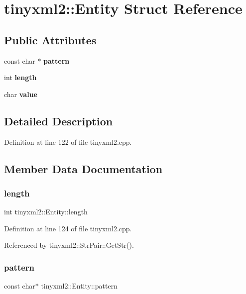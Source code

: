 \section{tinyxml2\+::Entity Struct Reference}
\label{structtinyxml2_1_1_entity}
\subsection*{Public Attributes}
\begin{DoxyCompactItemize}
\item 
const char $\ast$ \textbf{ pattern}
\item 
int \textbf{ length}
\item 
char \textbf{ value}
\end{DoxyCompactItemize}


\subsection{Detailed Description}


Definition at line 122 of file tinyxml2.\+cpp.



\subsection{Member Data Documentation}
\mbox{\label{structtinyxml2_1_1_entity_a25e2b57cb59cb4fa68f283d7cb570f21}} 
\subsubsection{length}
{\footnotesize\ttfamily int tinyxml2\+::\+Entity\+::length}



Definition at line 124 of file tinyxml2.\+cpp.



Referenced by tinyxml2\+::\+Str\+Pair\+::\+Get\+Str().

\mbox{\label{structtinyxml2_1_1_entity_ab330f5d665d29bfc811ecfa76315894b}} 
\subsubsection{pattern}
{\footnotesize\ttfamily const char$\ast$ tinyxml2\+::\+Entity\+::pattern}



